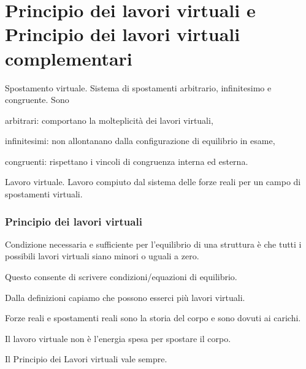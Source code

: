 \section{Principio dei lavori virtuali e Principio dei lavori virtuali complementari}


\begin{definizioneBox}
Spostamento virtuale. Sistema di spostamenti arbitrario, infinitesimo e congruente. Sono
\begin{compactitem}
    \item arbitrari: comportano la molteplicità dei lavori virtuali,\\
    \item infinitesimi: non allontanano dalla configurazione di equilibrio in esame,\\
    \item congruenti: rispettano i vincoli di congruenza interna ed esterna.
\end{compactitem}
\end{definizioneBox}
\begin{definizioneBox}
Lavoro virtuale. Lavoro compiuto dal sistema delle forze reali per un campo di spostamenti virtuali.
\end{definizioneBox}

\subsubsection*{Principio dei lavori virtuali}
Condizione necessaria e sufficiente per l'equilibrio di una struttura è che tutti i possibili lavori virtuali siano minori o uguali a zero.
\\

\begin{compactitem}
    \item Questo consente di scrivere condizioni/equazioni di equilibrio.\\
    \item Dalla definizioni capiamo che possono esserci più lavori virtuali.\\
    \item Forze reali e spostamenti reali sono la storia del corpo e sono dovuti ai carichi.\\
    \item Il lavoro virtuale non è l'energia spesa per spostare il corpo.
\end{compactitem}

Il Principio dei Lavori virtuali vale sempre.

